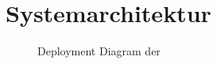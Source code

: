 \chapter{Systemarchitektur}
\label{chap:systemarchitektur}

\begin{figure}
    \centering
    
    \caption{Deployment Diagram der \shst{}}
    \label{fig:ss-deployment-diagram}
\end{figure}

\iffalse
Soll Überblick über das System sharing-station geben
Topologie des Systems
Ein Deployment-Diagram nach UML gibt einen Überblick über das Gesamtsystem
\fi